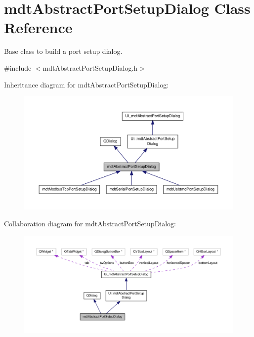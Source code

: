 \hypertarget{classmdt_abstract_port_setup_dialog}{\section{mdt\-Abstract\-Port\-Setup\-Dialog Class Reference}
\label{classmdt_abstract_port_setup_dialog}
}


Base class to build a port setup dialog.  




{\ttfamily \#include $<$mdt\-Abstract\-Port\-Setup\-Dialog.\-h$>$}



Inheritance diagram for mdt\-Abstract\-Port\-Setup\-Dialog\-:\nopagebreak
\begin{figure}[H]
\begin{center}
\leavevmode
\includegraphics[width=350pt]{classmdt_abstract_port_setup_dialog__inherit__graph}
\end{center}
\end{figure}


Collaboration diagram for mdt\-Abstract\-Port\-Setup\-Dialog\-:\nopagebreak
\begin{figure}[H]
\begin{center}
\leavevmode
\includegraphics[width=350pt]{classmdt_abstract_port_setup_dialog__coll__graph}
\end{center}
\end{figure}
